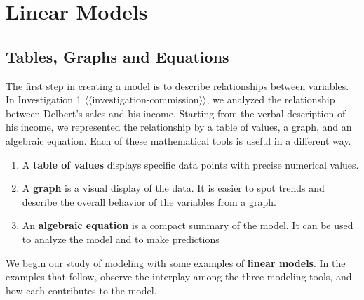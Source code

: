 \documentclass[10pt,]{book}
\newcommand{\terminology}[1]{\textbf{#1}}
\theoremstyle{plain}
\theoremstyle{definition}
\theoremstyle{definition}
\theoremstyle{definition}
\theoremstyle{definition}
\theoremstyle{definition}
\numberwithin{equation}{section}
\begin{document}
%
\typeout{************************************************}
\typeout{************************************************}
\section[Linear Models]{Linear Models}\label{LinMod}
\typeout{************************************************}
\typeout{************************************************}
\subsection[Tables, Graphs and Equations]{Tables, Graphs and Equations}\label{subsection-1}
The first step in creating a model is to describe relationships between variables.  In Investigation 1 {$\langle\langle$investigation-commission$\rangle\rangle$}, we analyzed the relationship between Delbert's sales and his income.  Starting from the verbal description of his income, we represented the relationship by a table of values, a graph, and an algebraic equation.  Each of these mathematical tools is useful in a different way.%
\leavevmode%
\begin{enumerate}
\item\hypertarget{li-10}{}A \terminology{table of values} displays specific data points with precise numerical values.%
\item\hypertarget{li-11}{}A \terminology{graph} is a visual display of the data.  It is easier to spot trends and describe the overall behavior of the variables from a graph.%
\item\hypertarget{li-12}{}An \terminology{algebraic equation} is a compact summary of the model.  It can be used to analyze the model and to make predictions%
\end{enumerate}
\par
We begin our study of modeling with some examples of \terminology{linear models}.  In the examples that follow, observe the interplay among the three modeling tools, and how each contributes to the model.%
\end{document}
